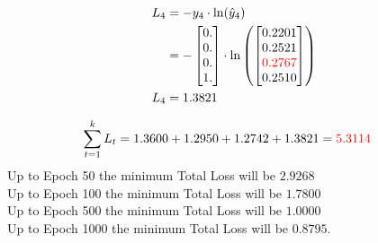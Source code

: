 \documentclass{article}
\begin{document}
\begin{align*}
    L_4 &= -y_4 \cdot \ln(\hat{y}_4) \\
    &= -\begin{bmatrix} 0. \\ 0. \\ 0. \\ 1. \end{bmatrix} \cdot \ln\left(\begin{bmatrix} 0.2201\\
0.2521\\
\textcolor{red}{0.2767}\\
0.2510\\
\end{bmatrix}\right) \\
    L_4 &= 1.3821
\end{align*}

\begin{align*}
    \sum_{t=1}^k L_t & = 1.3600 + 1.2950 + 1.2742 + 1.3821 = \textcolor{red}{5.3114}
\end{align*}
Up to Epoch 50 the minimum Total Loss will be $2.9268$\\
Up to Epoch 100 the minimum Total Loss will be $1.7800$\\
Up to Epoch 500 the minimum Total Loss will be $1.0000$\\
Up to Epoch 1000 the minimum Total Loss will be $0.8795$.
\end{document}
